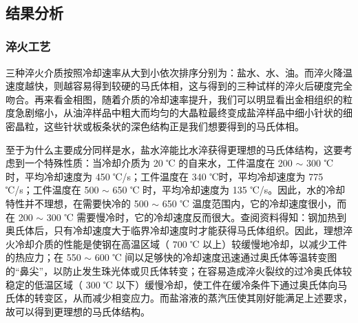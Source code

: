 \documentclass[a4paper,utf8]{article}
\begin{document}
\begin{figure}[!ht]
            \hspace{30pt} 
             \\
        \end{figure}
    \subsection{结果分析}
        \subsubsection{淬火工艺}
            三种淬火介质按照冷却速率从大到小依次排序分别为：盐水、水、油。而淬火降温速度越快，则越容易得到较硬的马氏体相，这与得到的三种试样的淬火后硬度完全吻合。再来看金相图，随着介质的冷却速率提升，我们可以明显看出金相组织的粒度急剧缩小，从油淬样品中粗大而均匀的大晶粒最终变成盐淬样品中细小针状的细密晶粒，这些针状或板条状的深色结构正是我们想要得到的马氏体相。\par
            至于为什么主要成分同样是水，盐水淬能比水淬获得更理想的马氏体结构，这要考虑到一个特殊性质：当冷却介质为 20 ℃ 的自来水，工件温度在 200 $\sim$ 300 ℃ 时，平均冷却速度为 450 ℃/s；工件温度在 340 ℃时，平均冷却速度为 775 ℃/s；工件温度在 500 $\sim$ 650 ℃ 时，平均冷却速度为 135 ℃/s。因此，水的冷却特性并不理想，在需要快冷的 500 $\sim$ 650 ℃ 温度范围内，它的冷却速度很小，而在 200 $\sim$ 300 ℃ 需要慢冷时，它的冷却速度反而很大。查阅资料得知：钢加热到奥氏体后，只有冷却速度大于临界冷却速度时才能获得马氏体组织。因此，理想淬火冷却介质的性能是使钢在高温区域（ 700 ℃ 以上）较缓慢地冷却，以减少工件的热应力；在 550 $\sim$ 600 ℃ 间以足够快的冷却速度迅速通过奥氏体等温转变图的“鼻尖”，以防止发生珠光体或贝氏体转变；在容易造成淬火裂纹的过冷奥氏体较稳定的低温区域（ 300 ℃ 以下）缓慢冷却，使工件在缓冷条件下通过奥氏体向马氏体的转变区，从而减少相变应力。而盐溶液的蒸汽压使其刚好能满足上述要求，故可以得到更理想的马氏体结构。
\end{document}
